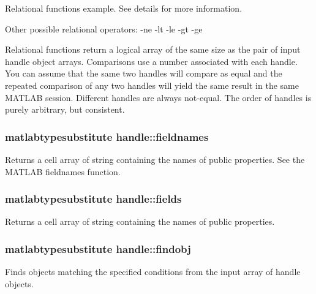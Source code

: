 Relational functions example. See details for more information. 

\begin{DoxyParagraph}{Other possible relational operators\-:}
-\/ne -\/lt -\/le -\/gt -\/ge
\end{DoxyParagraph}
Relational functions return a logical array of the same size as the pair of input handle object arrays. Comparisons use a number associated with each handle. You can assume that the same two handles will compare as equal and the repeated comparison of any two handles will yield the same result in the same M\-A\-T\-L\-A\-B session. Different handles are always not-\/equal. The order of handles is purely arbitrary, but consistent. \hypertarget{classhandle_a7086577f3953d4bd9ce17b07c4f6e141}{
\subsubsection[{fieldnames}]{\setlength{\rightskip}{0pt plus 5cm}matlabtypesubstitute {\bf handle\-::fieldnames}}}\label{classhandle_a7086577f3953d4bd9ce17b07c4f6e141}


Returns a cell array of string containing the names of public properties. See the M\-A\-T\-L\-A\-B fieldnames function. 

\hypertarget{classhandle_ad9c0557345e68bd933889c28b2a9484b}{
\subsubsection[{fields}]{\setlength{\rightskip}{0pt plus 5cm}matlabtypesubstitute {\bf handle\-::fields}}}\label{classhandle_ad9c0557345e68bd933889c28b2a9484b}


Returns a cell array of string containing the names of public properties. 

\hypertarget{classhandle_a000398ac90dd973b4618c739e6fd64a9}{
\subsubsection[{findobj}]{\setlength{\rightskip}{0pt plus 5cm}matlabtypesubstitute {\bf handle\-::findobj}}}\label{classhandle_a000398ac90dd973b4618c739e6fd64a9}


Finds objects matching the specified conditions from the input array of handle objects. 

